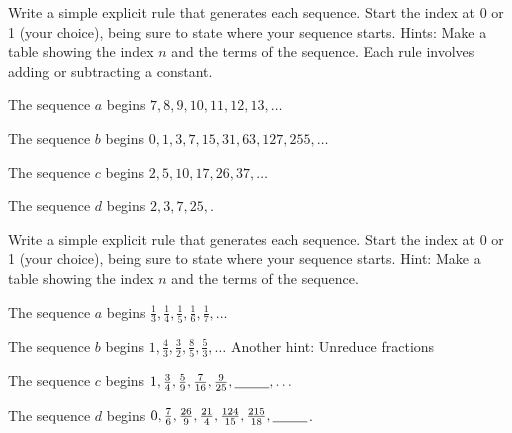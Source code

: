 \begin{exer}[\exerU] %
\label{exer_NTE_shifts}
    Write a simple explicit rule that generates each sequence.  Start the index at 0 or 1 (your choice), being sure to state where your sequence starts. Hints: Make a table showing the index $n$ and the terms of the sequence. Each rule involves adding or subtracting a constant.
        \begin{exerpart}
            \item The sequence $a$ begins $7,8, 9, 10, 11, 12, 13, \ldots$ %
            \item The sequence $b$ begins $0, 1, 3, 7, 15, 31, 63, 127, 255, \ldots$ %
            \item The sequence $c$ begins $2, 5, 10, 17, 26, 37, \ldots$ %
            \item The sequence $d$ begins $2, 3, 7, 25, $. %
        \end{exerpart}
\end{exer}

\begin{exer}[\exerU] %
\label{exer_NTE_fractions}   
    Write a simple explicit rule that generates each sequence.  Start the index at 0 or 1 (your choice), being sure to state where your sequence starts. Hint: Make a table showing the index $n$ and the terms of the sequence.
        \begin{exerpart}
            \item The sequence $a$ begins $\frac{1}{3}, \frac{1}{4}, \frac{1}{5}, \frac{1}{6}, \frac{1}{7},  \ldots$ 
            \item The sequence $b$ begins $1, \frac{4}{3}, \frac{3}{2}, \frac{8}{5}, \frac{5}{3},  \ldots$ Another hint: Unreduce fractions
            \item The sequence $c$ begins $1, \frac{3}{4}, \frac{5}{9}, \frac{7}{16}, \frac{9}{25},  \underline{\hspace{.3in}~}, \ldots$ %
            \item The sequence $d$ begins $0, \frac{7}{6}, \frac{26}{9}, \frac{21}{4}, \frac{124}{15}, \frac{215}{18}, \underline{\hspace{.3in}~}$.  %
        \end{exerpart}
\end{exer}

